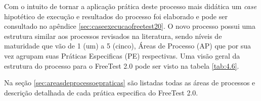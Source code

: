 Com o intuito de tornar a aplicação prática deste processo mais didática um \textit{case} hipotético de execução e resultados do processo foi elaborado e pode ser consultado no apêndice \ref{sec:caseexecucaofreetest20}. O novo processo possui uma estrutura similar aos processos revisados na literatura, sendo níveis de maturidade que vão de 1 (um) a 5 (cinco), Áreas de Processo (AP) que por sua vez agrupam suas Práticas Especificas (PE) respectivas. Uma visão geral da estrutura do processo para o FreeTest 2.0 pode ser visto na tabela \ref{tab:4.6}. 

Na seção \ref{sec:areasdeprocessoepraticas} são listadas todas as áreas de processos e descrição detalhada de cada prática especifica do FreeTest 2.0.

\begin{table}[H]
\caption{Estrutura completa proposta para o FreeTest 2.0.}
\label{tab:4.6}
\end{table}
